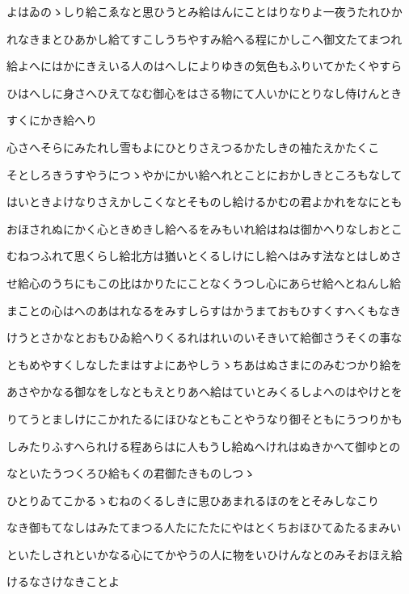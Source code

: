 \documentclass[a4paper,11pt,landscape]{ltjtarticle}
\begin{document}
\par\medskip
よはゐのゝしり給こゑなと思ひうとみ給はんにことはりなりよ一夜うたれひか
\par\medskip
れなきまとひあかし給てすこしうちやすみ給へる程にかしこへ御文たてまつれ
\par\medskip
給よへにはかにきえいる人のはへしによりゆきの気色もふりいてかたくやすら
\par\medskip
ひはへしに身さへひえてなむ御心をはさる物にて人いかにとりなし侍けんとき
\par\medskip
すくにかき給へり
\par\medskip
心さへそらにみたれし雪もよにひとりさえつるかたしきの袖たえかたくこ
\par\medskip
そとしろきうすやうにつゝやかにかい給へれとことにおかしきところもなして
\par\medskip
はいときよけなりさえかしこくなとそものし給けるかむの君よかれをなにとも
\par\medskip
おほされぬにかく心ときめきし給へるをみもいれ給はねは御かへりなしおとこ
\par\medskip
むねつふれて思くらし給北方は猶いとくるしけにし給へはみす法なとはしめさ
\par\medskip
せ給心のうちにもこの比はかりたにことなくうつし心にあらせ給へとねんし給
\par\medskip
まことの心はへのあはれなるをみすしらすはかうまておもひすくすへくもなき
\par\medskip
けうとさかなとおもひゐ給へりくるれはれいのいそきいて給御さうそくの事な
\par\medskip
ともめやすくしなしたまはすよにあやしうゝちあはぬさまにのみむつかり給を
\par\medskip
あさやかなる御なをしなともえとりあへ給はていとみくるしよへのはやけとを
\par\medskip
りてうとましけにこかれたるにほひなともことやうなり御そともにうつりかも
\par\medskip
しみたりふすへられける程あらはに人もうし給ぬへけれはぬきかへて御ゆとの
\par\medskip
なといたうつくろひ給もくの君御たきものしつゝ
\par\medskip
ひとりゐてこかるゝむねのくるしきに思ひあまれるほのをとそみしなこり
\par\medskip
なき御もてなしはみたてまつる人たにたたにやはとくちおほひてゐたるまみい
\par\medskip
といたしされといかなる心にてかやうの人に物をいひけんなとのみそおほえ給
\par\medskip
けるなさけなきことよ
\par\medskip
\end{document}
